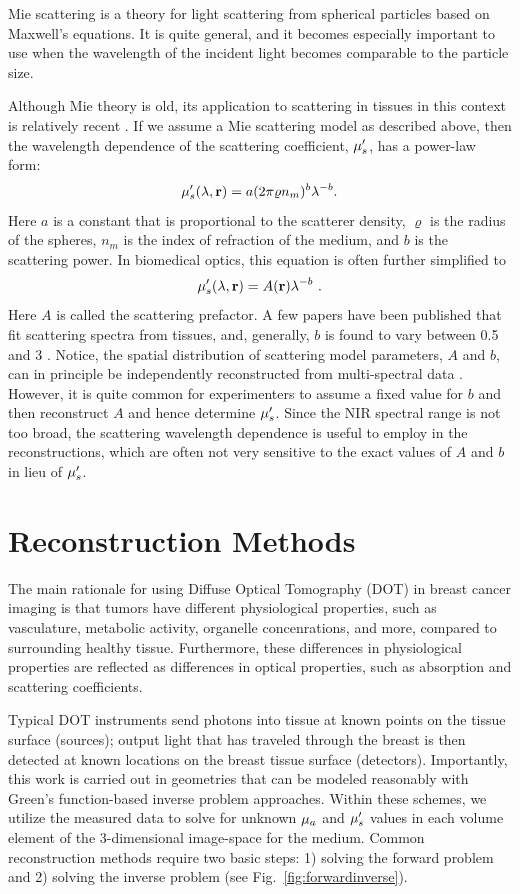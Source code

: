 Mie scattering is a theory for light scattering from spherical particles based on Maxwell's equations. It is quite general, and it becomes especially important to use when the wavelength of the incident light becomes comparable to the particle size. 

Although Mie theory is old, its application to scattering in tissues in this context is relatively recent \cite{Mourant1997,Bevilacqua2000,Jacques2013}. If we assume a Mie scattering model as described above, then the wavelength dependence of the scattering coefficient,  $\mu_s^{\prime}$, has a power-law form: 
%
\begin{equation}
\mu_s^{\prime}(\lambda,\mathbf{r}) = a(2\pi\varrho n_m)^b \lambda^{-b}  .
\end{equation}
%
Here $a$ is a constant that is proportional to the scatterer density, $\varrho$ is the radius of the spheres, $n_m$ is the index of refraction of the medium, and $b$ is the scattering power. In biomedical optics, this equation is often further simplified to
%
\begin{equation}
\label{eqn:Mie}
\mu_s^{\prime}(\lambda,\mathbf{r}) = A(\mathbf{r}) \lambda^{-b} \ .
\end{equation}
Here $A$ is called the scattering prefactor. A few papers have been published that fit scattering spectra from tissues, and, generally, $b$ is found to vary between 0.5 and 3 \cite{Bevilacqua2000,Jacques2013}. Notice, the spatial distribution of scattering model parameters, $A$ and $b$, can in principle be independently reconstructed from multi-spectral data \cite{Corlu2005}. However, it is quite common for experimenters to assume a fixed value for $b$ and then reconstruct $A$ and hence determine $\mu_s^{\prime}$. Since the NIR spectral range is not too broad, the scattering wavelength dependence is useful to employ in the reconstructions, which are often not very sensitive to the exact values of $A$ and $b$ in lieu of $\mu_s^{\prime}$.
%
\section{Reconstruction Methods}
The main rationale for using Diffuse Optical Tomography (DOT) in breast cancer imaging is that tumors have different physiological properties, such as vasculature, metabolic activity, organelle concenrations, and more, compared to surrounding healthy tissue. Furthermore, these differences in physiological properties are reflected as differences in optical properties, such as absorption and scattering coefficients.

Typical DOT instruments send photons into tissue at known points on the tissue surface (sources); output light that has traveled through the breast is then detected at known locations on the breast tissue surface (detectors). Importantly, this work is carried out in geometries that can be modeled reasonably with Green's function-based inverse problem approaches. Within these schemes, we utilize the measured data to solve for unknown $\mu_a$ and $\mu_s^{\prime}$ values in each volume element of the 3-dimensional image-space for the medium. Common reconstruction methods require two basic steps: 1) solving the forward problem and 2) solving the inverse problem (see Fig.~\ref{fig:forwardinverse}).


